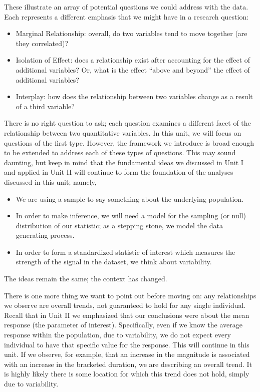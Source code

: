 \documentclass[
  letterpaper,
  DIV=11,
  numbers=noendperiod]{scrreprt}
\providecommand{\tightlist}{%
  \setlength{\itemsep}{0pt}\setlength{\parskip}{0pt}}\usepackage{longtable,booktabs,array}
\theoremstyle{definition}
\theoremstyle{definition}
\theoremstyle{plain}
\theoremstyle{remark}
\begin{document}
These illustrate an array of potential questions we could address with
the data. Each represents a different emphasis that we might have in a
research question:

\begin{itemize}
\tightlist
\item
  Marginal Relationship: overall, do two variables tend to move together
  (are they correlated)?
\item
  Isolation of Effect: does a relationship exist after accounting for
  the effect of additional variables? Or, what is the effect ``above and
  beyond'' the effect of additional variables?
\item
  Interplay: how does the relationship between two variables change as a
  result of a third variable?
\end{itemize}

There is no right question to ask; each question examines a different
facet of the relationship between two quantitative variables. In this
unit, we will focus on questions of the first type. However, the
framework we introduce is broad enough to be extended to address each of
these types of questions. This may sound daunting, but keep in mind that
the fundamental ideas we discussed in Unit I and applied in Unit II will
continue to form the foundation of the analyses discussed in this unit;
namely,

\begin{itemize}
\tightlist
\item
  We are using a sample to say something about the underlying
  population.
\item
  In order to make inference, we will need a model for the sampling (or
  null) distribution of our statistic; as a stepping stone, we model the
  data generating process.
\item
  In order to form a standardized statistic of interest which measures
  the strength of the signal in the dataset, we think about variability.
\end{itemize}

The ideas remain the same; the context has changed.

There is one more thing we want to point out before moving on: any
relationships we observe are overall trends, not guaranteed to hold for
any single individual. Recall that in Unit II we emphasized that our
conclusions were about the mean response (the parameter of interest).
Specifically, even if we know the average response within the
population, due to variability, we do not expect every individual to
have that specific value for the response. This will continue in this
unit. If we observe, for example, that an increase in the magnitude is
associated with an increase in the bracketed duration, we are describing
an overall trend. It is highly likely there is some location for which
this trend does not hold, simply due to variability.
\end{document}
